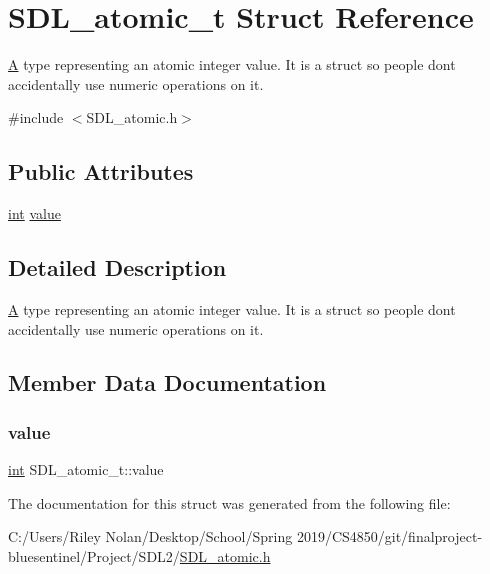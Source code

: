 \hypertarget{struct_s_d_l__atomic__t}{}\section{S\+D\+L\+\_\+atomic\+\_\+t Struct Reference}
\label{struct_s_d_l__atomic__t}


\mbox{\hyperlink{struct_a}{A}} type representing an atomic integer value. It is a struct so people don\textquotesingle{}t accidentally use numeric operations on it.  




{\ttfamily \#include $<$S\+D\+L\+\_\+atomic.\+h$>$}

\subsection*{Public Attributes}
\begin{DoxyCompactItemize}
\item 
\mbox{\hyperlink{warnings_8h_a74f207b5aa4ba51c3a2ad59b219a423b}{int}} \mbox{\hyperlink{struct_s_d_l__atomic__t_a0d09ddf3cc5798c709edb7cea104203a}{value}}
\end{DoxyCompactItemize}


\subsection{Detailed Description}
\mbox{\hyperlink{struct_a}{A}} type representing an atomic integer value. It is a struct so people don\textquotesingle{}t accidentally use numeric operations on it. 

\subsection{Member Data Documentation}
\mbox{\label{struct_s_d_l__atomic__t_a0d09ddf3cc5798c709edb7cea104203a}} 
\subsubsection{\texorpdfstring{value}{value}}
{\footnotesize\ttfamily \mbox{\hyperlink{warnings_8h_a74f207b5aa4ba51c3a2ad59b219a423b}{int}} S\+D\+L\+\_\+atomic\+\_\+t\+::value}



The documentation for this struct was generated from the following file\+:\begin{DoxyCompactItemize}
\item 
C\+:/\+Users/\+Riley Nolan/\+Desktop/\+School/\+Spring 2019/\+C\+S4850/git/finalproject-\/bluesentinel/\+Project/\+S\+D\+L2/\mbox{\hyperlink{_s_d_l__atomic_8h}{S\+D\+L\+\_\+atomic.\+h}}\end{DoxyCompactItemize}
